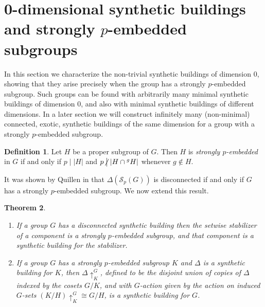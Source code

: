 \documentclass[12pt]{amsart}
\theoremstyle{plain}
\newtheorem{theorem}{Theorem}[section]
\theoremstyle{definition}
\newtheorem{definition}[theorem]{Definition}
\theoremstyle{remark}
\numberwithin{equation}{section}
\newcommand{\SpCpx}[2]{\Delta(\mathcal{S}_{#2}(#1))}
\newcommand{\notdivide}{\kern-2.1pt\not\kern2.1pt\bigm|}
\begin{document}


\section{0-dimensional synthetic buildings and strongly $p$-embedded subgroups}

In this section we characterize the non-trivial synthetic buildings of dimension 0, showing that they arise precisely when the group has a strongly $p$-embedded subgroup. Such groups can be found with arbitrarily many minimal synthetic buildings of dimension 0, and also with minimal synthetic buildings of different dimensions. In a later section we will construct infinitely many (non-minimal) connected, exotic, synthetic buildings of the same dimension for a group with a strongly $p$-embedded subgroup.

\begin{definition}
    Let $H$ be a proper subgroup of $G$. Then $H$ is \textit{strongly $p$-embedded} in $G$ if and only if $p\mid |H|$ and $p\notdivide |H\cap {}^gH|$ whenever $g\not\in H$.
\end{definition}

It was shown by Quillen in \cite{Qui1978} that $\SpCpx{G}{p}$ is disconnected if and only if $G$ has a strongly $p$-embedded subgroup. We now extend this result.

\begin{theorem}
\label{SPES-theorem}
\begin{enumerate}
    \item If a group $G$ has a disconnected synthetic building then the setwise stabilizer of a component is a strongly $p$-embedded subgroup, and that component is a synthetic building for the stabilizer.
    \item If a group $G$ has a strongly $p$-embedded subgroup $K$ and $\Delta$ is a synthetic building for $K$, then $\Delta\uparrow_K^G$, defined to be the disjoint union of copies of $\Delta$ indexed by the cosets $G/K$, and with $G$-action given by the action on induced $G$-sets $(K/H)\uparrow_K^G\cong G/H$, is a synthetic building for $G$.
\end{enumerate}
\end{theorem}
\end{document}
